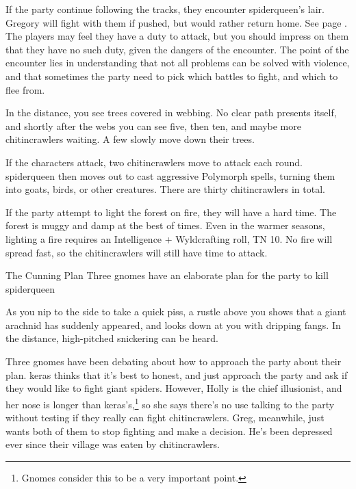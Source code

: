 \begin{multicols}{2}
If the party continue following the tracks, they encounter \gls{spiderqueen}'s lair.
Gregory will fight with them if pushed, but would rather return home.
See page \pageref{spiderqueen}.
The players may feel they have a duty to attack, but you should impress on them that they have no such duty, given the dangers of the encounter.
The point of the encounter lies in understanding that not all problems can be solved with violence, and that sometimes the party need to pick which battles to fight, and which to flee from.

\begin{boxtext}
	In the distance, you see trees covered in webbing.  No clear path presents itself, and shortly after the webs you can see five, then ten, and maybe more chitincrawlers waiting.  A few slowly move down their trees.
\end{boxtext}

If the characters attack, two chitincrawlers move to attack each round.
\Gls{spiderqueen} then moves out to cast aggressive Polymorph spells, turning them into goats, birds, or other creatures.
There are thirty chitincrawlers in total.

If the party attempt to light the forest on fire, they will have a hard time.
The forest is muggy and damp at the best of times.
Even in the warmer seasons, lighting a fire requires an Intelligence + Wyldcrafting roll, TN 10.
No fire will spread fast, so the chitincrawlers will still have time to attack.


{The Cunning Plan}%
{Three gnomes have an elaborate plan for the party to kill \gls{spiderqueen}}%

\begin{boxtext}

	As you nip to the side to take a quick piss, a rustle above you shows that a giant arachnid has suddenly appeared, and looks down at you with dripping fangs.  In the distance, high-pitched snickering can be heard.

\end{boxtext}

Three gnomes have been debating about how to approach the party about their plan.
\Gls{keras} thinks that it's best to honest, and just approach the party and ask if they would like to fight giant spiders.
However, Holly is the chief illusionist, and her nose is longer than \gls{keras}'s,\footnote{Gnomes consider this to be a very important point.} so she says there's no use talking to the party without testing if they really can fight chitincrawlers.
Greg, meanwhile, just wants both of them to stop fighting and make a decision.
He's been depressed ever since their village was eaten by chitincrawlers.


\end{multicols}
